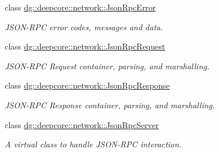 \begin{DoxyCompactItemize}
class \hyperlink{classdg_1_1deepcore_1_1network_1_1_json_rpc_error}{dg\+::deepcore\+::network\+::\+Json\+Rpc\+Error}
\begin{DoxyCompactList}\small\item\em J\+S\+O\+N-\/\+R\+PC error codes, messages and data. \end{DoxyCompactList}\item 
class \hyperlink{classdg_1_1deepcore_1_1network_1_1_json_rpc_request}{dg\+::deepcore\+::network\+::\+Json\+Rpc\+Request}
\begin{DoxyCompactList}\small\item\em J\+S\+O\+N-\/\+R\+PC Request container, parsing, and marshalling. \end{DoxyCompactList}\item 
class \hyperlink{classdg_1_1deepcore_1_1network_1_1_json_rpc_response}{dg\+::deepcore\+::network\+::\+Json\+Rpc\+Response}
\begin{DoxyCompactList}\small\item\em J\+S\+O\+N-\/\+R\+PC Response container, parsing, and marshalling. \end{DoxyCompactList}\item 
class \hyperlink{classdg_1_1deepcore_1_1network_1_1_json_rpc_server}{dg\+::deepcore\+::network\+::\+Json\+Rpc\+Server}
\begin{DoxyCompactList}\small\item\em A virtual class to handle J\+S\+O\+N-\/\+R\+PC interaction. \end{DoxyCompactList}\end{DoxyCompactItemize}
